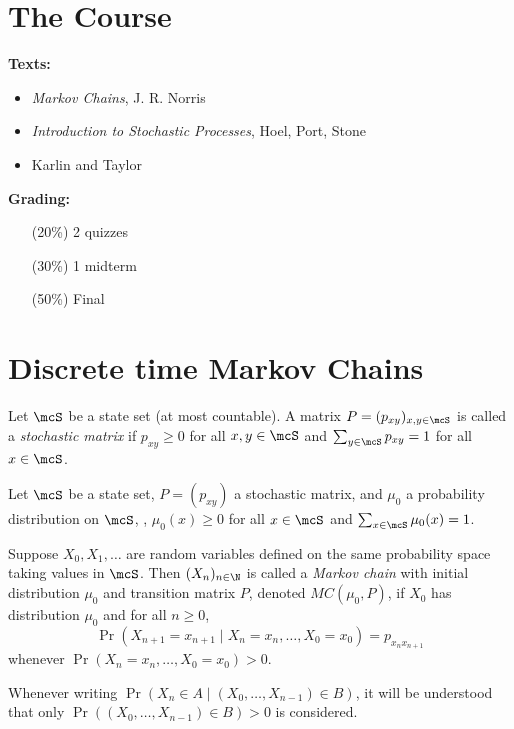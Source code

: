 
\setcounter{chapter}{-1}
\chapter{The Course} \label{sec:course}
\textbf{Texts:} \begin{itemize}
    \item \textit{Markov Chains}, J. R. Norris
    \item \textit{Introduction to Stochastic Processes}, Hoel, Port, Stone
    \item Karlin and Taylor
\end{itemize}

\textbf{Grading:} \begin{itemize}
    \item[(20\%)] 2 quizzes
    \item[(30\%)] 1 midterm
    \item[(50\%)] Final
\end{itemize}

\chapter{Discrete time Markov Chains} \label{sec:dtmc}
\begin{definition} \label{def:stochastic_matrix}
    Let $\mcS$ be a state set (at most countable).
    A matrix $P = (p_{xy})_{x,y \in \mcS}$ is called a \emph{stochastic matrix}
    if $p_{xy} \ge 0$ for all $x, y \in \mcS$ and $\sum_{y \in \mcS} p_{xy} = 1$
    for all $x \in \mcS$.
\end{definition}

\begin{definition*} \label{def:markov}
    Let $\mcS$ be a state set, $P = (p_{xy})$ a stochastic matrix, and $\mu_0$
    a probability distribution on $\mcS$, \ie, $\mu_0(x) \ge 0$ for all
    $x \in \mcS$ and $\sum_{x \in \mcS} \mu_0(x) = 1$.

    Suppose $X_0, X_1, \dots$ are random variables defined on the same
    probability space taking values in $\mcS$.
    Then $(X_n)_{n \in \N}$ is called a \emph{Markov chain} with initial
    distribution $\mu_0$ and transition matrix $P$, denoted $MC(\mu_0, P)$,
    if $X_0$ has distribution $\mu_0$ and for all $n \ge 0$, \[
        \Pr(X_{n+1} = x_{n+1} \mid X_n = x_n, \dots, X_0 = x_0)
            = p_{x_n x_{n+1}}
    \] whenever $\Pr(X_n = x_n, \dots, X_0 = x_0) > 0$.
\end{definition*}
\begin{notation}
    Whenever writing $\Pr(X_n \in A \mid (X_0, \dots, X_{n-1}) \in B)$, it
    will be understood that only $\Pr((X_0, \dots, X_{n-1}) \in B) > 0$ is
    considered.
\end{notation}

